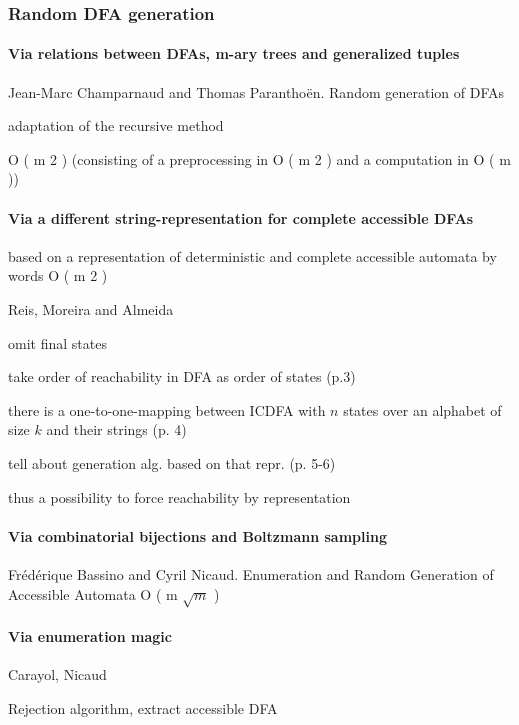 \subsubsection{Random DFA generation}

\paragraph{Via relations between DFAs, m-ary trees and generalized tuples}

Jean-Marc Champarnaud and Thomas Paranthoën. Random generation of DFAs\cite{CP05}

adaptation of the
recursive method

 O ( m 2 ) (consisting of a preprocessing in O ( m 2 ) and
a computation in O ( m ))

\paragraph{Via a different string-representation for complete accessible DFAs}

 based on a representation of deterministic
and complete accessible automata by words O ( m 2 )

Reis, Moreira and Almeida~\cite{RMA05}\cite{AMR09}

omit final states

take order of reachability in DFA as order of states (p.3)

there is a one-to-one-mapping between ICDFA with $n$ states over an alphabet of size $k$ and their strings (p. 4)

tell about generation alg. based on that repr. (p. 5-6)

thus a possibility to force reachability by representation

\paragraph{Via combinatorial bijections and Boltzmann sampling}

Frédérique Bassino and Cyril Nicaud. Enumeration and Random Generation of Accessible
Automata  O ( m $\sqrt{m}$ )

\paragraph{Via enumeration magic}

Carayol, Nicaud~\cite[p. 9]{CN12}

Rejection algorithm, extract accessible DFA

